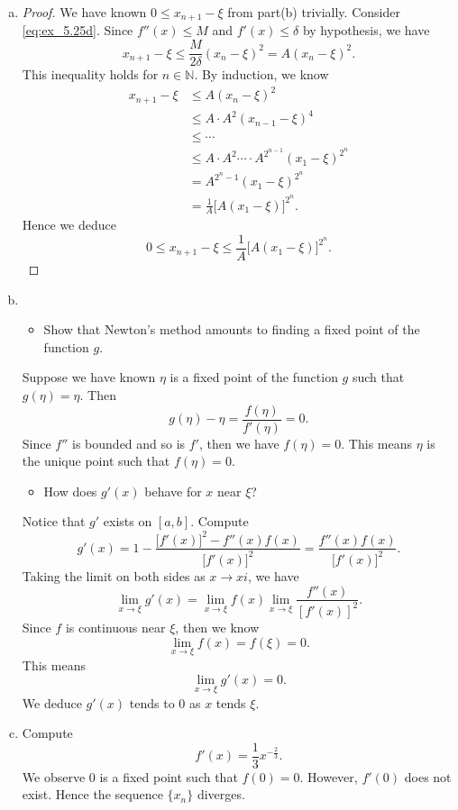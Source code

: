 \begin{Exercise}
\begin{enumerate}[(a)]
		\item
		\begin{proof}
			We have known $0 \leq x_{n+1} - \xi$ from part(b) trivially.
			Consider \eqref{eq:ex_5.25d}.
			Since $f''(x) \leq M$ and $f'(x) \leq \delta$ by hypothesis, we have
			$$
			x_{n+1}-\xi \leq \frac{M}{2\delta}(x_n-\xi)^2 = A(x_n-\xi)^2.
			$$
			This inequality holds for $n\in\mathbb{N}$. By induction, we know
			\begin{align*}
			x_{n+1}-\xi
			&\leq A(x_n-\xi)^2 \\
			&\leq A\cdot A^2 (x_{n-1}-\xi)^4 \\
			&\leq \cdots \\
			&\leq A\cdot A^2 \cdots \cdot A^{2^{n-1}} (x_1-\xi)^{2^n} \\
			&= A^{2^n-1} (x_1-\xi)^{2^n} \\
			&= \frac{1}{A} \big[A(x_1-\xi)\big]^{2^n}.
			\end{align*}
			Hence we deduce
			$$
			0 \leq x_{n+1}-\xi \leq \frac{1}{A} \big[A(x_1-\xi)\big]^{2^n}.
			$$
		\end{proof}
		
		\item
		\begin{itemize}
			\item Show that Newton's method amounts to finding a fixed point of the function $g$. 
		\end{itemize}
		\begin{solution}
			Suppose we have known $\eta$ is a fixed point of the function $g$ such that $g(\eta) = \eta$. Then
			$$
			g(\eta) - \eta = \frac{f(\eta)}{f'(\eta)} = 0.
			$$
			Since $f''$ is bounded and so is $f'$, then we have $f(\eta) = 0$.
			This means $\eta$ is the unique point such that $f(\eta) = 0$.
		\end{solution}
		\begin{itemize}
			\item How does $g'(x)$ behave for $x$ near $\xi$?
		\end{itemize}
		\begin{solution}
			Notice that $g'$ exists on $[a,b]$. Compute
			$$
			g'(x) = 1 - \frac{\big[ f'(x) \big]^2 - f''(x) f(x)}{\big[ f'(x) \big]^2} = \frac{f''(x) f(x)}{\big[ f'(x) \big]^2}.
			$$
			Taking the limit on both sides as $x\to xi$, we have
			$$
			\lim_{x\to\xi}g'(x) = \lim_{x\to\xi}f(x) \lim_{x\to\xi} \frac{f''(x)}{[f'(x)]^2}.
			$$
			Since $f$ is continuous near $\xi$, then we know
			$$
			\lim_{x\to\xi} f(x) = f(\xi) = 0.
			$$
			This means
			$$
			\lim_{x\to\xi}g'(x) = 0.
			$$
			We deduce $g'(x)$ tends to $0$ as $x$ tends $\xi$.
		\end{solution}
		
		\item
		\begin{solution}
			Compute
			$$
			f'(x) = \frac{1}{3} x^{-\frac{2}{3}}.
			$$
			We observe $0$ is a fixed point such that $f(0) = 0$.
			However, $f'(0)$ does not exist.
			Hence the sequence $\{x_n\}$ diverges.
		\end{solution}
	\end{enumerate}
\end{Exercise}